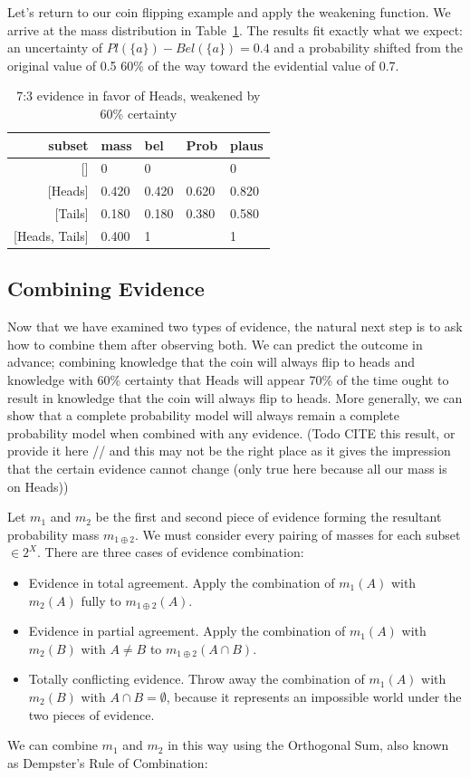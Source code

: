 \documentclass[letterpaper]{article}
\begin{document}
Let's return to our coin flipping example and apply the weakening function.  We arrive at the mass distribution in Table~\ref{tab:CoinFlipWeakened}.  The results fit exactly what we expect: an uncertainty of $Pl(\{a\})-Bel(\{a\})=0.4$ and a probability shifted from the original value of 0.5 60\% of the way toward the evidential value of 0.7.
\begin{table}[htbp]
\centering
\caption{7:3 evidence in favor of Heads, weakened by 60\% certainty}
\begin{tabular}{rllll}
\toprule
                subset&mass &bel  &Prob &plaus\\
\midrule
                    {[]}&0    &0    &     &0    \\
               {[Heads]}&0.420&0.420&0.620&0.820\\
               {[Tails]}&0.180&0.180&0.380&0.580\\
        {[Heads, Tails]}&0.400&1    &     &1    \\
\bottomrule
\end{tabular}
\label{tab:CoinFlipWeakened}
\end{table}

\subsection{Combining Evidence}
Now that we have examined two types of evidence, the natural next step is to ask how to combine them after observing both.  We can predict the outcome in advance; combining knowledge that the coin will always flip to heads and knowledge with 60\% certainty that Heads will appear 70\% of the time ought to result in knowledge that the coin will always flip to heads.  More generally, we can show that a complete probability model will always remain a complete probability model when combined with any evidence. (Todo CITE this result, or provide it here // and this may not be the right place as it gives the impression that the certain evidence cannot change (only true here because all our mass is on Heads))

Let $m_1$ and $m_2$ be the first and second piece of evidence forming the resultant probability mass $m_{1 \oplus 2}$.  We must consider every pairing of masses for each subset $\in 2^X$.  There are three cases of evidence combination:
\begin{itemize}
\item Evidence in total agreement. Apply the combination of $m_1(A)$ with $m_2(A)$ fully to $m_{1 \oplus 2}(A)$.
\item Evidence in partial agreement.  Apply the combination of $m_1(A)$ with $m_2(B)$ with $A \neq B$ to $m_{1 \oplus 2}(A \cap B)$.
\item Totally conflicting evidence.  Throw away the combination of $m_1(A)$ with $m_2(B)$ with $A \cap B = \emptyset$, because it represents an impossible world under the two pieces of evidence.
\end{itemize}
We can combine $m_1$ and $m_2$ in this way using the Orthogonal Sum, also known as Dempster's Rule of Combination:
\end{document}
